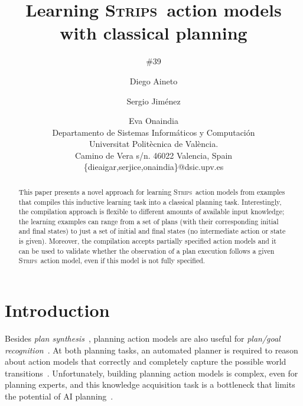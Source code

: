 \documentclass[letterpaper]{article} %
\newcommand{\strips}{\textsc{Strips}}     %
\begin{document}
\title{Learning \strips\ action models with classical planning}
\author{\#39}


\author{Diego Aineto\and Sergio Jim\'enez\and Eva Onaindia\\
{\small Departamento de Sistemas Inform\'aticos y Computaci\'on}\\
{\small Universitat Polit\`ecnica de Val\`encia.}\\
{\small Camino de Vera s/n. 46022 Valencia, Spain}\\
{\small \{dieaigar,serjice,onaindia\}@dsic.upv.es}}

\maketitle
\begin{abstract}
This paper presents a novel approach for learning \strips\ action models from examples that compiles this inductive learning task into a classical planning task. Interestingly, the compilation approach is flexible to different amounts of available input knowledge; the learning examples can range from a set of plans (with their corresponding initial and final states) to just a set of initial and final states (no intermediate action or state is given). Moreover, the compilation accepts partially specified action models and it can be used to validate whether the observation of a plan execution follows a given \strips\ action model, even if this model is not fully specified.
\end{abstract}


\section{Introduction}
Besides {\em plan synthesis}~\cite{ghallab2004automated}, planning action models are also useful for {\em plan/goal recognition}~\cite{ramirez2012plan}. At both planning tasks, an automated planner is required to reason about action models that correctly and completely capture the possible world transitions~\cite{geffner:book:2013}. Unfortunately, building planning action models is complex, even for planning experts, and this knowledge acquisition task is a bottleneck that limits the potential of AI planning~\cite{kambhampati:modellite:AAAI2007}.
\end{document}
